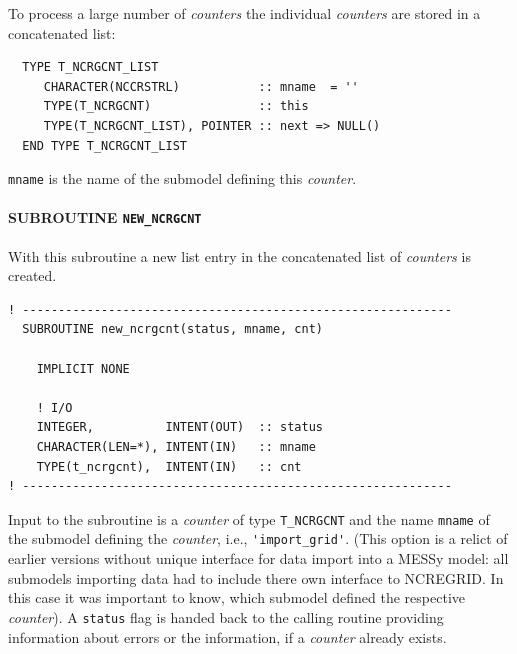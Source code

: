 \documentclass[11pt,twoside]{report}
\begin{document}
To process a large number of {\it counters} the individual {\it
counters} are stored in a concatenated list:
\begin{verbatim}
  TYPE T_NCRGCNT_LIST
     CHARACTER(NCCRSTRL)           :: mname  = ''
     TYPE(T_NCRGCNT)               :: this
     TYPE(T_NCRGCNT_LIST), POINTER :: next => NULL()
  END TYPE T_NCRGCNT_LIST
\end{verbatim}
\verb|mname| is the name of the submodel defining this {\it counter}.

\paragraph{SUBROUTINE \color{blue} \tt\bf NEW\_NCRGCNT\\ \label{IGCNTNEW}}
With this subroutine a new list entry in the concatenated list of {\it counters}
is created. 
\begin{verbatim}
! ------------------------------------------------------------
  SUBROUTINE new_ncrgcnt(status, mname, cnt)

    IMPLICIT NONE

    ! I/O
    INTEGER,          INTENT(OUT)  :: status
    CHARACTER(LEN=*), INTENT(IN)   :: mname
    TYPE(t_ncrgcnt),  INTENT(IN)   :: cnt
! ------------------------------------------------------------
\end{verbatim}
Input to the subroutine is a {\it counter} of type \verb|T_NCRGCNT|
and the name 
\verb|mname| of the submodel defining the {\it counter},
i.e., \verb|'import_grid'|. 
(This option is a relict of earlier versions without unique interface
for data import into a MESSy model: all submodels importing data had
to include there own interface to NCREGRID. In this case it was
important to know, which submodel defined the respective {\it counter}).
 A \verb|status| flag is handed back to the calling routine providing 
information about errors or the information, if a {\it counter}
already exists. 
\end{document}

